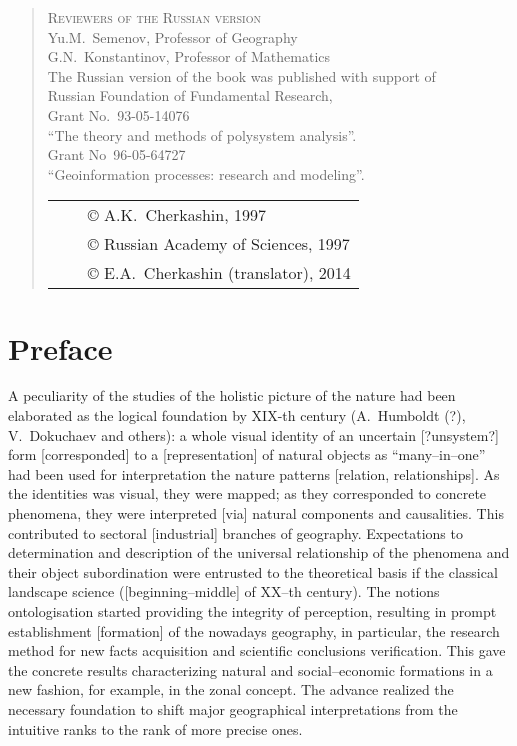\documentclass[12pt,leqno]{book}
\begin{document}
\begin{quote}
\begin{center}
\textsc{Reviewers of the Russian version}\\{}
Yu.M.~Semenov, Professor of Geography\\{}
G.N.~Konstantinov, Professor of Mathematics\\{}
\vspace{1em}
The Russian version of the book was published with support of\\{} Russian Foundation of Fundamental Research,\\{}
Grant No.~93-05-14076\\{}
``The theory and methods of polysystem analysis''.\\{}
Grant No~96-05-64727\\{}
``Geoinformation processes: research and modeling''.
\end{center}
\vfill{}
\begin{tabular}{lcl}
{}\hspace{0.4\linewidth}{} & & \copyright{} A.K.~Cherkashin, 1997\\
& & \copyright{} Russian Academy of Sciences, 1997\\
& & \copyright{} E.A.~Cherkashin (translator), 2014
\end{tabular}
\end{quote}
\chapter*{Preface}\normalsize
\pagestyle{plain}



A peculiarity of the studies of the holistic picture of the nature had been elaborated as the logical foundation by XIX-th century (A.~Humboldt (?), V.~Dokuchaev and others): a whole visual identity of an uncertain [?unsystem?] form [corresponded] to a [representation] of natural objects as ``many--in--one'' had been used for interpretation the nature patterns [relation, relationships]. As the identities was visual, they were mapped; as they corresponded to concrete phenomena, they were interpreted [via] natural components and causalities. This contributed to sectoral [industrial] branches of geography. Expectations to determination and description of the universal relationship of the phenomena and their object subordination were entrusted to the theoretical basis if the classical landscape science ([beginning--middle] of XX--th century). The notions ontologisation started providing the integrity of perception, resulting in prompt establishment [formation] of the nowadays geography, in particular, the research method for new facts acquisition and scientific conclusions verification. This gave the concrete results characterizing natural and social--economic formations in a new fashion, for example, in the zonal concept. The advance realized the necessary foundation to shift major geographical interpretations from the intuitive ranks to the rank of more precise ones.
\end{document}
